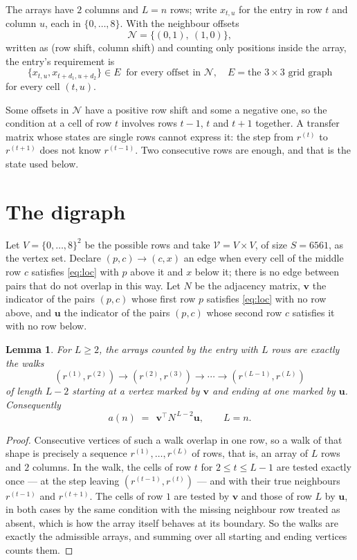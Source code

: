 \documentclass[11pt,a4paper]{article}
\theoremstyle{plain}
\newtheorem{lemma}[theorem]{Lemma}
\theoremstyle{definition}
\begin{document}
The arrays have $2$ columns and $L=n$ rows; write $x_{t,u}$ for the entry in
row $t$ and column $u$, each in $\{0,\dots,8\}$. With the neighbour offsets
\[
\mathcal N=\{(0,1),\ (1,0)\},
\]
written as (row shift, column shift) and counting only positions inside the array, the
entry's requirement is
\begin{equation}\label{eq:loc}
\{x_{t,u},x_{t+d_1,u+d_2}\}\in E\ \text{ for every offset in }\mathcal N,\quad E=\text{the 3}\times\text{3 grid graph}
\end{equation}
for every cell $(t,u)$.

Some offsets in $\mathcal N$ have a positive row shift and some a negative one, so the
condition at a cell of row $t$ involves rows $t-1$, $t$ and $t+1$ together. A transfer
matrix whose states are single rows cannot express it: the step from $r^{(t)}$ to
$r^{(t+1)}$ does not know $r^{(t-1)}$. Two consecutive rows are enough, and that is
the state used below.

\section{The digraph}

Let $V=\{0,\dots,8\}^{2}$ be the possible rows and take
$\mathcal V=V\times V$, of size $S=6561$, as the vertex set. Declare $(p,c)\to(c,x)$ an edge
when every cell of the middle row $c$ satisfies \eqref{eq:loc} with $p$ above it and $x$
below it; there is no edge between pairs that do not overlap in this way. Let $N$ be the
adjacency matrix, $\mathbf{v}$ the indicator of the pairs $(p,c)$ whose first row $p$
satisfies \eqref{eq:loc} with no row above, and $\mathbf{u}$ the indicator of
the pairs $(p,c)$ whose second row $c$ satisfies it with no row below.

\begin{lemma}\label{lem:walk}
For $L\ge2$, the arrays counted by the entry with $L$ rows are exactly the walks
\[
(r^{(1)},r^{(2)})\to(r^{(2)},r^{(3)})\to\cdots\to(r^{(L-1)},r^{(L)})
\]
of length $L-2$ starting at a vertex marked by $\mathbf{v}$ and ending at one marked by
$\mathbf{u}$. Consequently
\[
a(n)\;=\;\,\mathbf{v}^{\!\top}N^{\,L-2}\mathbf{u},\qquad L=n .
\]
\end{lemma}

\begin{proof}
Consecutive vertices of such a walk overlap in one row, so a walk of that shape is
precisely a sequence $r^{(1)},\dots,r^{(L)}$ of rows, that is, an array of $L$ rows
and $2$ columns. In the walk, the cells of row $t$ for $2\le t\le L-1$ are tested
exactly once --- at the step leaving $(r^{(t-1)},r^{(t)})$ --- and with their true
neighbours $r^{(t-1)}$ and $r^{(t+1)}$. The cells of row $1$ are tested by
$\mathbf{v}$ and those of row $L$ by $\mathbf{u}$, in both cases by the same condition
with the missing neighbour row treated as absent, which is how the array itself behaves at
its boundary. So the walks are exactly the admissible arrays, and summing over all starting
and ending vertices counts them.
\end{proof}
\end{document}
